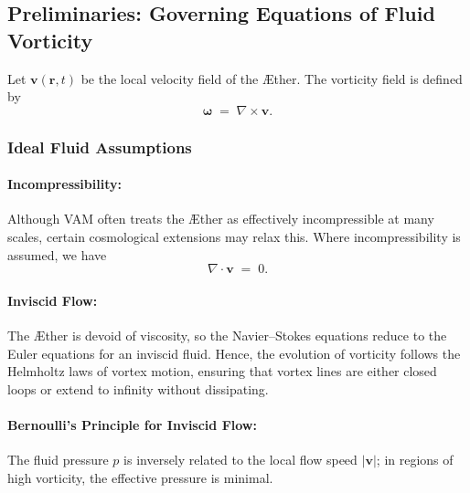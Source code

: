 \subsection{Preliminaries: Governing Equations of Fluid Vorticity}
Let \(\mathbf{v}(\mathbf{r},t)\) be the local velocity field of the Æther. The vorticity field is defined by
\[
    \boldsymbol{\omega} \;=\; \nabla \times \mathbf{v}.
\]

\subsubsection{Ideal Fluid Assumptions}
\paragraph{Incompressibility:}
Although VAM often treats the Æther as effectively incompressible at many scales, certain cosmological extensions may relax this. Where incompressibility is assumed, we have
\[
    \nabla \cdot \mathbf{v} \;=\; 0.
\]

\paragraph{Inviscid Flow:}
The Æther is devoid of viscosity, so the Navier–Stokes equations reduce to the Euler equations for an inviscid fluid. Hence, the evolution of vorticity follows the Helmholtz laws of vortex motion, ensuring that vortex lines are either closed loops or extend to infinity without dissipating.

\paragraph{Bernoulli's Principle for Inviscid Flow:}
The fluid pressure \(p\) is inversely related to the local flow speed \(\lvert \mathbf{v} \rvert\); in regions of high vorticity, the effective pressure is minimal.

